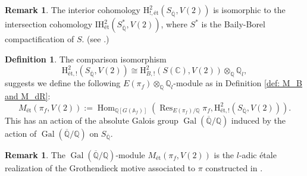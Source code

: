 \documentclass[11pt, a4paper]{amsart}
\theoremstyle{plain}
\theoremstyle{definition}
\newtheorem{definition}[theorem]{Definition}
\newtheorem{remark}[theorem]{Remark}
\numberwithin{equation}{section}
\def\AAA{\mathbb{A}}
\def\CC{\mathbb{C}}
\def\QQ{\mathbb{Q}}
\DeclareMathOperator{\Gal}{Gal}
\DeclareMathOperator{\Res}{Res}
\DeclareMathOperator{\Hom}{Hom}
\begin{document}
\begin{remark}
    The interior cohomology $\mathrm{H}_{!,\text{\'et}}^{2}(S_{\overline{\QQ}}, V(2))$ is isomorphic to the intersection cohomology $\mathrm{IH}^{2}_{\text{\'et}}(S^{*}_{\overline{\QQ}}, V(2))$, where $S^{*}$ is the Baily-Borel compactification of $S$. (see \cite[Corollary 2.3.3.4]{CavicchiThesis}.) 
\end{remark}

\begin{definition}
       The comparison isomorphism 
                \begin{equation*}
                    \mathrm{H}_{\text{\'et}, !}^{2}(S_{\overline{\QQ}}, V(2)) \cong \mathrm{H}_{B, !}^{2}(S(\CC), V(2)) \otimes_{\QQ} \QQ_{l}, 
                \end{equation*}
                suggests we define the following $E(\pi_f) \otimes_{\QQ} \QQ_{l}$-module as in Definition \ref{def: M_B and M_dR}:
                \begin{equation*}
                     M_{\text{\'{e}t}}(\pi_{f}, V(2)) := \Hom_{\QQ[G(\AAA_f)]}(\Res_{E(\pi_f)/\QQ}\pi_f, \mathrm{H}_{\text{\'{e}t}, !}^{2}(S_{\overline{\QQ}}, V(2))). 
                \end{equation*}
                This has an action of the absolute Galois group $\Gal(\overline{\QQ}/\QQ)$ induced by the action of $\Gal(\overline{\QQ}/\QQ)$ on $S_{\overline{\QQ}}$. 
\end{definition}

\begin{remark}
    The $\Gal(\overline{\QQ}/\QQ)$-module $M_{\text{\'{e}t}}(\pi_{f}, V(2))$ is the $l$-adic \'{e}tale realization of the Grothendieck motive associated to $\pi$ constructed in \cite[Theorem 5.6]{Wild_15}. 
\end{remark}
\end{document}
